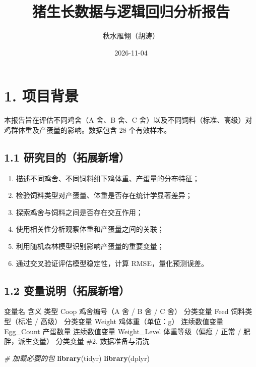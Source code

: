 \documentclass[
]{article}
\title{猪生长数据与逻辑回归分析报告}
\author{秋水雁翎（胡涛）}
\date{2026-11-04}
\newenvironment{Shaded}{\begin{snugshade}}{\end{snugshade}}
\newcommand{\CommentTok}[1]{\textcolor[rgb]{0.56,0.35,0.01}{\textit{#1}}}
\newcommand{\FunctionTok}[1]{\textcolor[rgb]{0.13,0.29,0.53}{\textbf{#1}}}
\newcommand{\NormalTok}[1]{#1}
\providecommand{\tightlist}{%
  \setlength{\itemsep}{0pt}\setlength{\parskip}{0pt}}
\begin{document}
\maketitle

{
\setcounter{tocdepth}{2}
\tableofcontents
}
\section{1. 项目背景}\label{ux9879ux76eeux80ccux666f}

本报告旨在评估不同鸡舍（A 舍、B 舍、C
舍）以及不同饲料（标准、高级）对鸡群体重及产蛋量的影响。数据包含 28
个有效样本。

\subsection{1.1
研究目的（拓展新增）}\label{ux7814ux7a76ux76eeux7684ux62d3ux5c55ux65b0ux589e}

\begin{enumerate}
\def\labelenumi{\arabic{enumi}.}
\tightlist
\item
  描述不同鸡舍、不同饲料组下鸡体重、产蛋量的分布特征；
\item
  检验饲料类型对产蛋量、体重是否存在统计学显著差异；
\item
  探索鸡舍与饲料之间是否存在交互作用；
\item
  使用相关性分析观察体重和产蛋量之间的关联；
\item
  利用随机森林模型识别影响产蛋量的重要变量；
\item
  通过交叉验证评估模型稳定性，计算 RMSE，量化预测误差。
\end{enumerate}

\subsection{1.2
变量说明（拓展新增）}\label{ux53d8ux91cfux8bf4ux660eux62d3ux5c55ux65b0ux589e}

变量名 含义 类型 Coop 鸡舍编号（A 舍 / B 舍 / C 舍） 分类变量 Feed
饲料类型（标准 / 高级） 分类变量 Weight 鸡体重（单位：g） 连续数值变量
Egg\_Count 产蛋数量 连续数值变量 Weight\_Level 体重等级（偏瘦 / 正常 /
肥胖，派生变量） 分类变量 \#2. 数据准备与清洗

\begin{Shaded}
\begin{Highlighting}[]
\CommentTok{\# 加载必要的包}
\FunctionTok{library}\NormalTok{(tidyr)}
\FunctionTok{library}\NormalTok{(dplyr)}
\end{Highlighting}
\end{Shaded}
\end{document}
